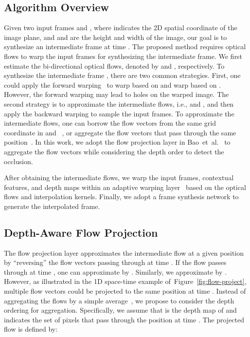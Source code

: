 \documentclass[10pt,twocolumn,letterpaper]{article}
\def\etal{et~al.\xspace}
\newcommand{\figref}[1]{Figure~\ref{fig:#1}}
\begin{document}
	\subsection{Algorithm Overview}
Given two input frames  and , where  indicates the 2D spatial coordinate of the image plane, and  and  are the height and width of the image, our goal is to synthesize an intermediate frame  at time .
The proposed method requires optical flows to warp the input frames for synthesizing the intermediate frame.
We first estimate the bi-directional optical flows, denoted by  and , respectively.
To synthesize the intermediate frame , there are two common strategies.
First, one could apply the forward warping~\cite{niklaus2018context} to warp  based on  and warp  based on .
However, the forward warping may lead to holes on the warped image.
The second strategy is to approximate the intermediate flows, i.e.,  and , and then apply the backward warping to sample the input frames.
To approximate the intermediate flows, one can borrow the flow vectors from the same grid coordinate in  and ~\cite{jiang2017super}, or aggregate the flow vectors that pass through the same position~\cite{bao2018MEMC-Net}.
In this work, we adopt the flow projection layer in Bao~\etal~\cite{bao2018MEMC-Net} to aggregate the flow vectors while considering the depth order to detect the occlusion.
	
	
	After obtaining the intermediate flows, we warp the input frames, contextual features, and depth maps within an adaptive warping layer~\cite{bao2018MEMC-Net} based on the optical flows and interpolation kernels.
Finally, we adopt a frame synthesis network to generate the interpolated frame.
	
	
	
\subsection{Depth-Aware Flow Projection}
The flow projection layer approximates the intermediate flow at a given position  by ``reversing'' the flow vectors passing through  at time .
If the flow  passes through  at time , one can approximate  by .
Similarly, we approximate  by .
However, as illustrated in the 1D space-time example of~\figref{flow-project}, multiple flow vectors could be projected to the same position at time .
Instead of aggregating the flows by a simple average~\cite{bao2018MEMC-Net}, we propose to consider the depth ordering for aggregation.
Specifically, we assume that  is the depth map of  and  indicates the set of pixels that pass through the position  at time .
The projected flow  is defined by:
\end{document}
